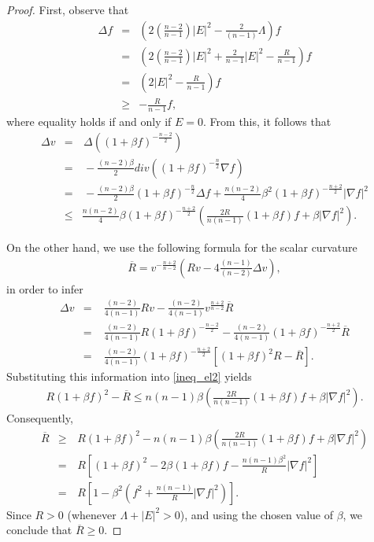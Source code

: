 \documentclass{amsart}
\numberwithin{equation}{section}
\begin{document}
		
	\begin{proof}
		First, observe that
		\begin{eqnarray}
			\Delta f&=&\left(2\left(\frac{n-2}{n-1}\right)|E|^{2}-\frac{2}{(n-1)}\Lambda\right)f\nonumber\\
			&=&\left(2\left(\frac{n-2}{n-1}\right)|E|^{2}+\frac{2}{n-1}|E|^{2}-\frac{R}{n-1}\right)f\nonumber\\
			&=&\left(2|E|^{2}-\frac{R}{n-1}\right)f\nonumber\\
			&\geq & -\frac{R}{n-1}f, \label{ineq_el1}
		\end{eqnarray}
		where equality holds if and only if $E=0.$ From this, it follows that
		\begin{eqnarray}\nonumber
			\Delta v &=&\,\Delta\left((1+\beta f)^{-\frac{n-2}{2}}\right)\\\nonumber
			&=&\,-\frac{(n-2)\beta}{2}div\left((1+\beta f)^{-\frac{n}{2}}\nabla f\right)\\
			&=&\, -\frac{(n-2)\beta}{2}(1+\beta f)^{-\frac{n}{2}}\Delta f + \frac{n(n-2)}{4}\beta^2 (1+\beta f)^{-\frac{n+2}{2}}|\nabla f|^2\nonumber\\
			&\leq &\frac{n(n-2)}{4}\beta(1+\beta f)^{-\frac{n+2}{2}}\left(\frac{2R}{n(n-1)}(1+\beta f)f+\beta|\nabla f|^2\right). \label{ineq_el2}
		\end{eqnarray}
		
		
		

		
		
		On the other hand, we use the following formula for the scalar curvature 
		\begin{eqnarray*}
			{\overline{R}}=v^{-\frac{n+2}{n-2}}\left(R v-4\frac{(n-1)}{(n-2)}\Delta v\right),
		\end{eqnarray*} 
		in order to infer
		\begin{eqnarray*}
			\Delta v&=&\;\frac{(n-2)}{4(n-1)}R v-\frac{(n-2)}{4(n-1)}v^{\frac{n+2}{n-2}}{\overline{R}}\\
			&=&\;\frac{(n-2)}{4(n-1)}R (1+\beta f)^{-\frac{n-2}{2}}-\frac{(n-2)}{4(n-1)}(1+\beta f)^{-\frac{n+2}{2}}{\overline{R}}\\
			&=&\;\frac{(n-2)}{4(n-1)}(1+\beta f)^{-\frac{n+2}{2}}\left[(1+\beta f)^2R-{\overline{R}}\right].
		\end{eqnarray*}
		Substituting this information into \eqref{ineq_el2} yields
		\begin{eqnarray*}
			R(1+\beta f)^2- {\overline{R}}\leq n(n-1)\beta \left(\frac{2 R}{n(n-1)}(1+\beta f)f+\beta|\nabla f|^2\right).
		\end{eqnarray*} 
		Consequently,
		\begin{eqnarray}\nonumber
			{\overline{R}}&\geq &\, R(1+\beta f)^2-n(n-1)\beta \left(\frac{2 R}{n(n-1)}(1+\beta f)f+\beta|\nabla f|^2\right)\\\nonumber
			&=&\, R\left[(1+\beta f)^2-2\beta(1+\beta f)f-\frac{n(n-1)\beta^2}{R}|\nabla f|^2\right]\\\label{eqq3}
			&=&\, R\left[1-\beta^2\left(f^2+\frac{n(n-1)}{R}|\nabla f|^2\right)\right].
		\end{eqnarray} Since $R>0$ (whenever $\Lambda+|E|^{2}>0$), and using the chosen value of $\beta$, we conclude that ${\overline{R}}\geq 0.$
		

\end{proof}
\end{document}
